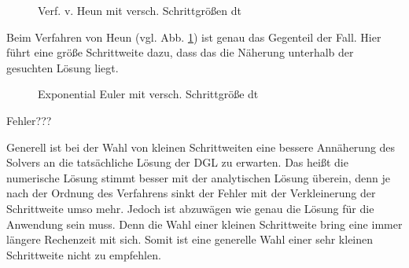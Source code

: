 \documentclass[conference]{IEEEtran}
\begin{document}
\begin{figure}[h!]
  	\centering
    \scalebox{.6}{}
    \caption{Verf. v. Heun mit versch. Schrittgrößen dt}
    \label{fig:heun}
\end{figure}
Beim Verfahren von Heun (vgl. Abb. \ref{fig:heun}) ist genau das Gegenteil der Fall. Hier führt eine größe Schrittweite dazu, dass das die Näherung unterhalb der gesuchten Lösung liegt.

\begin{figure}[h!]
  	\centering
    \scalebox{.6}{}
    \caption{Exponential Euler mit versch. Schrittgröße dt}
    \label{fig:expEuler}
\end{figure}
Fehler???

Generell ist bei der Wahl von kleinen Schrittweiten eine bessere Annäherung des Solvers an die tatsächliche Lösung der DGL zu erwarten. Das heißt die numerische Lösung stimmt besser mit der analytischen Lösung überein, denn je nach der Ordnung des Verfahrens sinkt der Fehler mit der Verkleinerung der Schrittweite umso mehr. Jedoch ist abzuwägen wie genau die Lösung für die Anwendung sein muss. Denn die Wahl einer kleinen Schrittweite bring eine immer längere Rechenzeit mit sich. Somit ist eine generelle Wahl einer sehr kleinen Schrittweite nicht zu empfehlen.
\end{document}
